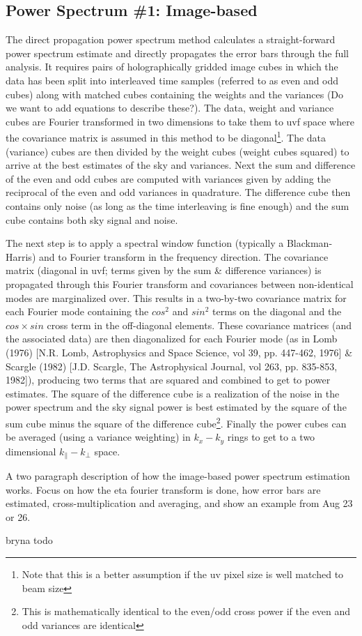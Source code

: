 \subsection{Power Spectrum \#1: Image-based}
The direct propagation power spectrum method calculates a straight-forward power spectrum estimate and directly propagates the error bars through the full analysis. It requires pairs of holographically gridded image cubes in which the data has been split into interleaved time samples (referred to as even and odd cubes) along with matched cubes containing the weights and the variances (Do we want to add equations to describe these?).  The data, weight and variance cubes are Fourier transformed in two dimensions to take them to uvf space where the covariance matrix is assumed in this method to be diagonal\footnote{Note that this is a better assumption if the uv pixel size is well matched to beam size}. The data (variance) cubes are then divided by the weight cubes (weight cubes squared) to arrive at the best estimates of the sky and variances. Next the sum and difference of the even and odd cubes are computed with variances given by adding the reciprocal of the even and odd variances in quadrature. The difference cube then contains only noise (as long as the time interleaving is fine enough) and the sum cube contains both sky signal and noise.

The next step is to apply a spectral window function (typically a Blackman-Harris) and to Fourier transform in the frequency direction. The covariance matrix (diagonal in uvf; terms given by the sum & difference variances) is propagated through this Fourier transform and covariances between non-identical modes are marginalized over. This results in a two-by-two covariance matrix for each Fourier mode containing the $cos^2$ and $sin^2$ terms on the diagonal and the $cos\times sin$ cross term in the off-diagonal elements. These covariance matrices (and the associated data) are then diagonalized for each Fourier mode (as in Lomb (1976) [N.R. Lomb, Astrophysics and Space Science, vol 39, pp. 447-462, 1976] & Scargle (1982) [J.D. Scargle, The Astrophysical Journal, vol 263, pp. 835-853, 1982]), producing two terms that are squared and combined to get to power estimates. The square of the difference cube is a realization of the noise in the power spectrum and the sky signal power is best estimated by the square of the sum cube minus the square of the difference cube\footnote{This is mathematically identical to the even/odd cross power if the even and odd variances are identical}. Finally the power cubes can be averaged (using a variance weighting) in $k_x-k_y$ rings to get to a two dimensional $k_{\|}-k_{\bot}$ space.


A two paragraph description of how the image-based power spectrum estimation works. Focus on how the eta fourier transform is done, how error bars are estimated, cross-multiplication and averaging, and show an example from Aug 23 or 26.

bryna todo
